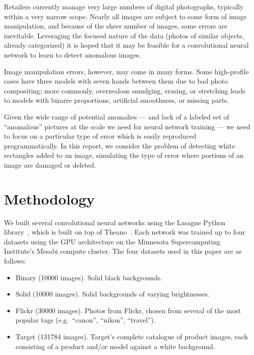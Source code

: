 \documentclass{article}
\newcommand{\dataset}[1]{\textsf{#1}}
\begin{document}
  Retailers currently manage very large numbers of digital photographs, typically within a very narrow scope. Nearly all images are subject to some form of image manipulation, and because of the sheer number of images, some errors are inevitable. Leveraging the focused nature of the data (photos of similar objects, already categorized) it is hoped that it may be feasible for a convolutional neural network to learn to detect anomalous images.

  Image manipulation errors, however, may come in many forms. Some high-profile cases have three models with seven hands between them due to bad photo compositing; more commonly, overzealous smudging, erasing, or stretching leads to models with bizarre proportions, artificial smoothness, or missing parts.

  Given the wide range of potential anomalies --- and lack of a labeled set of ``anomalous'' pictures at the scale we need for neural network training --- we need to focus on a particular type of error which is easily reproduced programmatically. In this report, we consider the problem of detecting white rectangles added to an image, simulating the type of error where portions of an image are damaged or deleted.


\section{Methodology}

  We built several convolutional neural networks using the Lasagne Python library~\cite{lasagne}, which is built on top of Theano~\cite{theano1,theano2}. Each network was trained up to four datasets using the GPU architecture on the Minnesota Supercomputing Institute's Mesabi compute cluster. The four datasets used in this paper are as follows:

  \begin{itemize}
    \item \dataset{Binary} (10000 images). Solid black backgrounds.
    \item \dataset{Solid} (10000 images). Solid backgrounds of varying brightnesses.
    \item \dataset{Flickr} (30000 images). Photos from Flickr, chosen from several of the most popular tags (e.g.\ ``canon'', ``nikon'', ``travel'').
    \item \dataset{Target} (131784 images). Target's complete catalogue of product images, each consisting of a product and/or model against a white background.
  \end{itemize}
\end{document}
